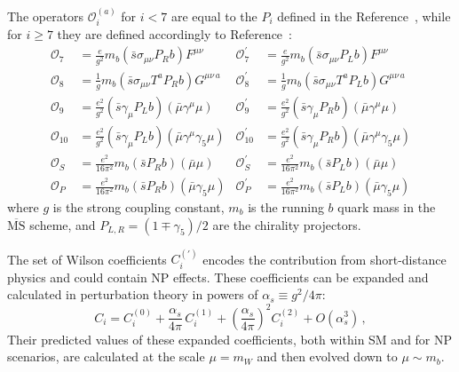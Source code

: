 The operators $\mathcal O_i^{(a)}$ for $i<7$ are equal to the $P_i$ defined in the Reference~\cite{Bobeth:1999mk}, while for $i\geq7$ they are defined accordingly to Reference~\cite{Altmannshofer:2008dz}:
\begin{align}
  {\mathcal{O}}_{7} &= \frac{e}{g^2} m_b (\bar{s} \sigma_{\mu \nu} P_R b) F^{\mu \nu} &
  {\mathcal{O}}_{7}^\prime &= \frac{e}{g^2} m_b (\bar{s} \sigma_{\mu \nu} P_L b) F^{\mu \nu} \label{eq:O7}\\
  {\mathcal{O}}_{8} &= \frac{1}{g} m_b (\bar{s} \sigma_{\mu \nu} T^a P_R b) G^{\mu \nu \, a} &
  {\mathcal{O}}_{8}^\prime &= \frac{1}{g} m_b (\bar{s} \sigma_{\mu \nu} T^a P_L b) G^{\mu \nu \, a} \label{eq:O8}\\
  {\mathcal{O}}_{9} &= \frac{e^2}{g^2} (\bar{s} \gamma_{\mu} P_L b)(\bar{\mu} \gamma^\mu \mu) &
  {\mathcal{O}}_{9}^\prime &= \frac{e^2}{g^2} (\bar{s} \gamma_{\mu} P_R b)(\bar{\mu} \gamma^\mu \mu) \label{eq:O9}\\
  {\mathcal{O}}_{10} &=\frac{e^2}{g^2} (\bar{s}  \gamma_{\mu} P_L b)(\bar{\mu} \gamma^\mu \gamma_5 \mu) &
  {\mathcal{O}}_{10}^\prime &=\frac{e^2}{g^2} (\bar{s}  \gamma_{\mu} P_R b)(\bar{\mu} \gamma^\mu \gamma_5 \mu) \label{eq:O10}\\
  {\mathcal{O}}_{S} &=\frac{e^2}{16\pi^2} m_b (\bar{s} P_R b)(\bar{\mu} \mu) &
  {\mathcal{O}}_{S}^\prime &=\frac{e^2}{16\pi^2} m_b (\bar{s} P_L b)(\bar{\mu} \mu) \label{eq:OS}\\
  {\mathcal{O}}_{P} &=\frac{e^2}{16\pi^2} m_b (\bar{s} P_R b)(\bar{\mu} \gamma_5 \mu) &
  {\mathcal{O}}_{P}^\prime &=\frac{e^2}{16\pi^2} m_b (\bar{s} P_L b)(\bar{\mu} \gamma_5 \mu) \label{eq:OP}
\end{align}
where $g$ is the strong coupling constant, $m_b$ is the running $b$ quark mass in the $\overline{\mathrm{MS}}$ scheme, and $P_{L,R}=(1\mp\gamma_5)/2$ are the chirality projectors.

The set of Wilson coefficients $C^{(\prime)}_i$ encodes the contribution from short-distance physics and could contain NP effects.
These coefficients can be expanded and calculated in perturbation theory in powers of $\alpha_s\equiv g^2/4\pi$:
\begin{equation}\label{WilExpansion}
  C_i = C_i^{(0)} + \frac{\alpha_s}{4\pi}\, C_i^{(1)} + \left(\frac{\alpha_s}{4\pi}\right)^2 C_i^{(2)} + O(\alpha_s^3)\,,
\end{equation}
Their predicted values of these expanded coefficients, both within SM and for NP scenarios, are calculated at the scale $\mu=m_W$ and then evolved down to $\mu\sim m_b$.

